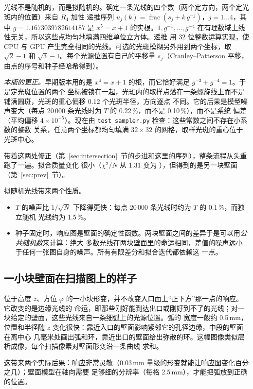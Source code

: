 \documentclass[11pt,a4paper,fontset=fandol]{ctexart}
\newcommand{\code}[1]{\texttt{#1}}
\begin{document}
光线不是随机的，而是拟随机的。确定一条光线的四个数（两个定方向，两个定光斑内的位置）来自 $R_4$ 加性
递推序列 $u_j(k)=\operatorname{frac}(s_j+k\,g^{-j})$，$j=1\ldots4$，其中 $g=1.1673039782614187$ 是
$x^5=x+1$ 的实根。$1,g^{-1},\ldots,g^{-4}$ 在有理数域上线性无关，所以这些点均匀地填满四维单位立方体。递推
用 32 位整数运算实现，使 CPU 与 GPU 产生完全相同的光线。可选的光斑模糊另外用到两个坐标，取 $\sqrt2-1$ 和
$\sqrt3-1$。每个光源位置有自己的平移量 $s_j$（Cranley--Patterson 平移，由点的序号和种子经哈希得到）。

\emph{本版的更正。}早期版本用的是 $x^4=x+1$ 的根，而它恰好满足 $g^{-3}+g^{-4}=1$。于是定光斑位置的两个
坐标被锁在一起，光斑内的取样点落在一条螺旋线上而不是铺满圆斑，光斑的重心偏移 0.12 个光斑半径，方向逐点
不同。它的后果是模型噪声变大（每点 20\,000 条光线时为 $T$ 的 0.22\,\%，而不是 0.10\,\%），而不是系统
偏差（平均偏移 $4\times10^{-5}$）。现在由 \code{test\_sampler.py} 检查：这些常数之间不存在小系数的整数
关系，任意两个坐标都均匀填满 $32\times32$ 的网格，取样光斑的重心位于光斑中心。

带着这两处修正（第~\ref{sec:intersection}~节的步进和这里的序列），整条流程从头重跑了一遍。拟合质量变化
很小（$\chi^2/N$ 从 1.31 变为 \ChiTwo），但得到的是另一块壁面（第~\ref{sec:prev}~节）。

拟随机光线带来两个性质。
\begin{itemize}
\item $T$ 的噪声比 $1/\sqrt{N}$ 下降得更快：每点 20\,000 条光线时约为 $T$ 的 0.1\,\%，而独立随机
光线约为 1.5\,\%。
\item 种子固定时，响应图是壁面的确定性函数。两块壁面之间的差异于是可以用\emph{公共随机数}来计算：绝大
多数光线在两块壁面里的命运相同，差值的噪声远小于任何一张图自身的噪声。所有有限差分和拟合迭代都依赖这
一点。
\end{itemize}

\subsection{一小块壁面在扫描图上的样子}

位于高度 $z$、方位 $\varphi$ 的一小块形变，并不改变入口面上“正下方”那一点的响应。它改变的是边缘光线的
命运，即那些刚好能到达出口或刚好到不了的光线；对一块给定的壁面，这些光线来自一条细弧上的光源位置。弧的
宽度一般约 0.5\,mm，位置和半径随 $z$ 变化很快：靠近入口的壁面影响紧邻它的孔径边缘，中段的壁面在离中心
几毫米处画出弧和环，靠近出口的壁面给出弥散的环。这幅图像类似层析成像，每个扫描像素对壁面形变沿一条曲线
求和。

这带来两个实际后果：响应非常灵敏（0.03\,mm 量级的形变就能让响应图变化百分之几）；壁面模型在轴向需要
足够细的分辨率（每格 2.5\,mm），才能把弧放到正确的位置。
\end{document}
